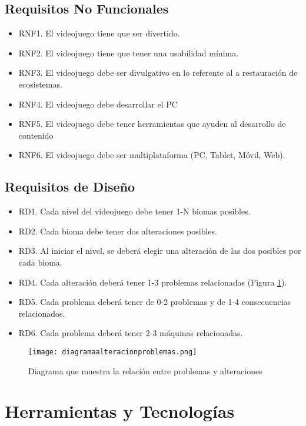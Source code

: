 \subsection{Requisitos No Funcionales}

\begin{itemize}
    \item RNF1. El videojuego tiene que ser divertido.
    \item RNF2. El videojuego tiene que tener una usabilidad mínima.
    \item RNF3. El videojuego debe ser divulgativo en lo referente al a restauración de ecosistemas.
    \item RNF4. El videojuego debe desarrollar el PC
    \item RNF5. El videojuego debe tener herramientas que ayuden al desarrollo de contenido
    \item RNF6. El videojuego debe ser multiplataforma (PC, Tablet, Móvil, Web).
\end{itemize}

\subsection{Requisitos de Diseño}

\begin{itemize}
    \item RD1. Cada nivel del videojuego debe tener 1-N biomas posibles.
    \item RD2. Cada bioma debe tener dos alteraciones posibles.
    \item RD3. Al iniciar el nivel, se deberá elegir una alteración de las dos posibles por cada bioma.
    \item RD4. Cada alteración deberá tener 1-3 problemas relacionadas (Figura \ref{fig:diagramaalt}).
    \item RD5. Cada problema deberá tener de 0-2 problemas y de 1-4 consecuencias relacionados.
    \item RD6. Cada problema deberá tener 2-3 máquinas relacionadas.
\end{itemize}

\begin{figure}[H]
    \centering
      \texttt{[image: diagramaalteracionproblemas.png]}
    \caption{Diagrama que muestra la relación entre problemas y alteraciones}
    \label{fig:diagramaalt}
\end{figure}

\section{Herramientas y Tecnologías}

